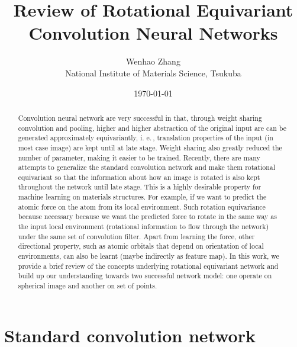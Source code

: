 \documentclass{article}
\begin{document}
\title{Review of Rotational Equivariant Convolution Neural Networks}
\author{Wenhao Zhang \\ National Institute of Materials Science, Tsukuba}
\date{\today}

\maketitle

\begin{abstract}
    Convolution neural network are very successful in that, through weight sharing convolution and pooling, higher and higher abstraction 
    of the original input are can be generated approximately equivariantly, i. e.\,, translation properties of the input (in most case image)
    are kept until at late stage. Weight sharing also greatly reduced the number of parameter, making it easier to be trained. 
    Recently, there are many attempts to generalize the standard convolution network and make them rotational equivariant so that the information
    about how an image is rotated is also kept throughout the network until late stage. This is a highly desirable property for machine learning 
    on materials structures. For example, if we want to predict the atomic force on the atom from its local environment. Such rotation equivariance 
    because necessary because we want the predicted force to rotate in the same way as the input local environment 
    (rotational information to flow through the network) under the same set of convolution filter. 
    Apart from learning the force, other directional property, such as atomic orbitals that depend on orientation of local environments, can also 
    be learnt (maybe indirectly as feature map).
    In this work, we provide a brief review of the concepts underlying rotational equivariant network and build up our understanding towards two 
    successful network model: one operate on spherical image and another on set of points.
\end{abstract}

\section{Standard convolution network}
\end{document}
